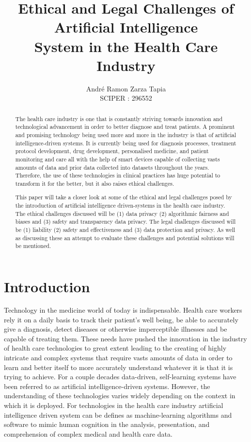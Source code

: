 \documentclass[a4paper,12pt,oneside]{report}
\title{Ethical and Legal Challenges of Artificial Intelligence \\ System in the Health Care Industry }
\author{André Ramon Zarza Tapia \\ SCIPER : 296552}
\begin{document}
\maketitle

\begin{abstract}
The health care industry is one that is constantly striving towards innovation and technological advancement in order to better diagnose and treat patients. A prominent and promising technology being used more and more in the industry is that of artificial intelligence-driven systems.  It is currently being used for diagnosis processes, treatment protocol development, drug development, personalised medicine, and patient monitoring and care all with the help of smart devices capable of collecting vasts amounts of data and prior data collected into datasets throughout the years. Therefore, the use of these technologies in clinical practices has huge potential to transform it for the better, but it also raises ethical challenges. 

\medskip

This paper will take a closer look at some of the ethical and legal challenges posed by the introduction of artificial intelligence driven-systems in the health care industry. The ethical challenges discussed will be (1) data privacy (2) algorithmic fairness and biases and (3) safety and transparency data privacy. The legal challenges discussed will be (1) liability (2) safety and effectiveness and (3) data protection and privacy. As well as discussing these an attempt to evaluate these challenges and potential solutions will be mentioned.


\end{abstract}


\maketoc

\chapter{Introduction}

Technology in the medicine world of today is indispensable. Health care workers rely it on a daily basis to track their patient's well being, be able to accurately give a diagnosis, detect diseases or otherwise imperceptible illnesses and be capable of treating them. These needs have pushed the innovation in the industry of health care technologies to great extent leading to the creating of highly intricate and complex systems that require vasts amounts of data in order to learn and better itself to more accurately understand whatever it is that it is trying to achieve. For a couple decades data-driven, self-learning systems have been referred to as artificial intelligence-driven systems. However, the understanding of these technologies varies widely depending on the context in which it is deployed. For technologies in the health care industry artificial intelligence driven system can be defines as machine-learning algorithms and software to mimic human cognition in the analysis, presentation, and comprehension of complex medical and health care data.
\end{document}
